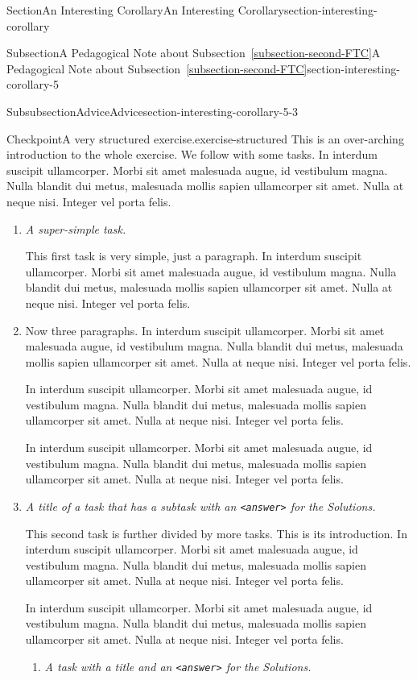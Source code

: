 \documentclass[twoside,10pt,]{article}
\newcommand{\xreffont}{\relax}
\newcommand{\mono}[1]{\texttt{#1}}
\newcommand{\lititle}[1]{{\slshape#1}}
\numberwithin{equation}{section}
\begin{document}
\begin{sectionptx}{Section}{An Interesting Corollary}{}{An Interesting Corollary}{}{}{section-interesting-corollary}
\begin{subsectionptx}{Subsection}{A Pedagogical Note about Subsection~{\xreffont\ref*{subsection-second-FTC}}}{}{A Pedagogical Note about Subsection~{\xreffont\ref*{subsection-second-FTC}}}{}{}{section-interesting-corollary-5}
\begin{subsubsectionptx}{Subsubsection}{Advice}{}{Advice}{}{}{section-interesting-corollary-5-3}
\begin{inlineexercise}{Checkpoint}{A very structured exercise.}{exercise-structured}
This is an over-arching introduction to the whole exercise.  We follow with some tasks.  In interdum suscipit ullamcorper. Morbi sit amet malesuada augue, id vestibulum magna. Nulla blandit dui metus, malesuada mollis sapien ullamcorper sit amet. Nulla at neque nisi. Integer vel porta felis.%
\begin{enumerate}[font=\bfseries,label=(\alph*),ref=\alph*]%
\item{}\lititle{A super-simple task.}\par%
This first task is very simple, just a paragraph.  In interdum suscipit ullamcorper. Morbi sit amet malesuada augue, id vestibulum magna. Nulla blandit dui metus, malesuada mollis sapien ullamcorper sit amet. Nulla at neque nisi. Integer vel porta felis.%
\item{}Now three paragraphs.  In interdum suscipit ullamcorper. Morbi sit amet malesuada augue, id vestibulum magna. Nulla blandit dui metus, malesuada mollis sapien ullamcorper sit amet. Nulla at neque nisi. Integer vel porta felis.%
\par
In interdum suscipit ullamcorper. Morbi sit amet malesuada augue, id vestibulum magna. Nulla blandit dui metus, malesuada mollis sapien ullamcorper sit amet. Nulla at neque nisi. Integer vel porta felis.%
\par
In interdum suscipit ullamcorper. Morbi sit amet malesuada augue, id vestibulum magna. Nulla blandit dui metus, malesuada mollis sapien ullamcorper sit amet. Nulla at neque nisi. Integer vel porta felis.%
\item{}\lititle{A title of a task that has a subtask with an \mono{<answer>} for the Solutions.}\par%
This second task is further divided by more tasks.  This is its introduction.  In interdum suscipit ullamcorper. Morbi sit amet malesuada augue, id vestibulum magna. Nulla blandit dui metus, malesuada mollis sapien ullamcorper sit amet. Nulla at neque nisi. Integer vel porta felis.%
\par
In interdum suscipit ullamcorper. Morbi sit amet malesuada augue, id vestibulum magna. Nulla blandit dui metus, malesuada mollis sapien ullamcorper sit amet. Nulla at neque nisi. Integer vel porta felis.%
\begin{enumerate}[font=\bfseries,label=(\roman*),ref=\theenumi.\roman*]%
\item{}\lititle{A task with a title and an \mono{<answer>} for the Solutions.}\par%

\end{enumerate}
\end{enumerate}
\end{inlineexercise}
\end{subsubsectionptx}
\end{subsectionptx}
\end{sectionptx}
\end{document}
